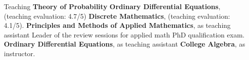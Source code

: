 \begin{rubric}{Teaching}
\entry*[2022 Fall]%
       \textbf{Theory of Probability}
\entry*[2022 Spring]%
       \textbf{Ordinary Differential Equations}, (teaching evaluation: 4.7/5)
\entry*[2021 Fall]%
        \textbf{Discrete Mathematics}, (teaching evaluation: 4.1/5).
% 
        \textbf{Principles and Methods of Applied Mathematics}, as teaching assistant
\entry*[2018 Summer] 
        Leader of the review sessions for applied math PhD qualification exam.%
% 
        \textbf{Ordinary Differential Equations}, as teaching assistant
% 
        \textbf{College Algebra}, as instructor.
\end{rubric}
